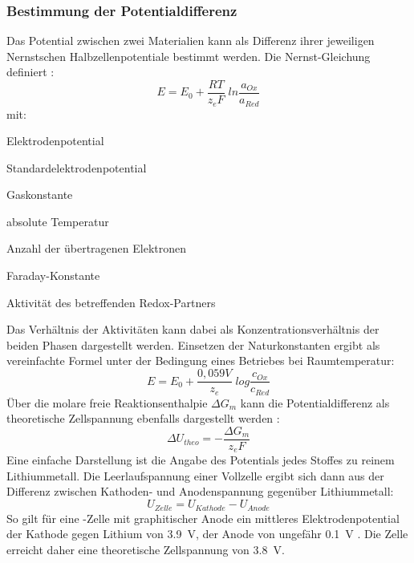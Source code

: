 \documentclass[a4paper, 11pt, headsepline,footsepline,twoside,abstract]{scrbook}
\begin{document}
\subsubsection{Bestimmung der Potentialdifferenz}
Das Potential zwischen zwei Materialien kann als Differenz ihrer jeweiligen Nernstschen Halbzellenpotentiale bestimmt werden. Die Nernst-Gleichung definiert \cite{atkins2006physical}:
\begin{equation}
E = E_0 + \frac{RT}{z_eF}\; ln \frac{a_{Ox}}{a_{Red}}
\end{equation}
mit:
\begin{description}\itemsep0pt
\item[E] Elektrodenpotential
\item[E$_0$] Standardelektrodenpotential
\item[R] Gaskonstante
\item[T] absolute Temperatur
\item[z$_e$] Anzahl der übertragenen Elektronen
\item[F] Faraday-Konstante
\item[a] Aktivität des betreffenden Redox-Partners
\end{description}
Das Verhältnis der Aktivitäten kann dabei als Konzentrationsverhältnis der beiden Phasen dargestellt werden. Einsetzen der Naturkonstanten ergibt als vereinfachte Formel unter der Bedingung eines Betriebes bei Raumtemperatur:
\begin{equation}
E = E_0 + \frac{0,059 V}{z_e} \; log \frac{c_{Ox}}{c_{Red}}
\end{equation}
Über die molare freie Reaktionsenthalpie $\Delta G_m$ kann die Potentialdifferenz als theoretische Zellspannung ebenfalls dargestellt werden \cite{mortimer}:
\begin{equation}
\Delta U_{theo} = -\frac{\Delta G_m}{z_eF}
\end{equation}
Eine einfache Darstellung ist die Angabe des Potentials jedes Stoffes zu reinem Lithiummetall. Die Leerlaufspannung einer Vollzelle ergibt sich dann aus der Differenz zwischen Kathoden- und Anodenspannung gegenüber Lithiummetall:
\begin{equation}
U_{Zelle} = U_{Kathode} - U_{Anode}
\end{equation}
So gilt für eine -Zelle mit graphitischer Anode ein mittleres Elektrodenpotential der Kathode gegen Lithium von \SI{3.9}{\volt}, der Anode von ungefähr \SI{0.1}{\volt} \cite{bub_skript}. Die Zelle erreicht daher eine theoretische Zellspannung von \SI{3.8}{\volt}.
\end{document}
